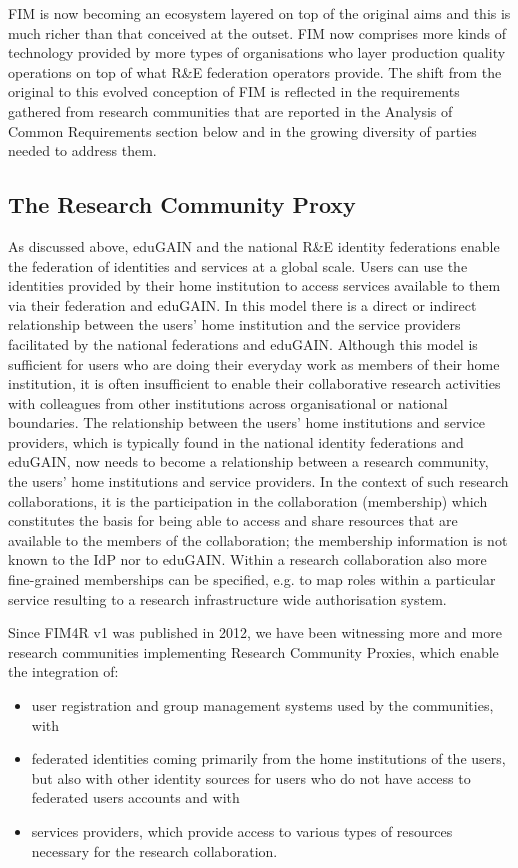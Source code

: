 \documentclass[fleqn,11pt]{wlscirep}
\begin{document}
{FIM is now becoming an ecosystem layered on top of the original aims and this is much richer than that conceived at the outset. FIM now comprises more kinds of technology provided by more types of organisations who layer production quality operations on top of what R\&E federation operators provide. The shift from the original to this evolved conception of FIM is reflected in the requirements gathered from research communities that are reported in the Analysis of Common Requirements section below and in the growing diversity of parties needed to address them.

\subsection{The Research Community Proxy}
As discussed above, eduGAIN and the national R\&E identity federations enable the federation of identities and services at a global scale. Users can use the identities provided by their home institution to access services available to them via their federation and eduGAIN. In this model there is a direct or indirect relationship between the users’ home institution and the service providers facilitated by the national federations and eduGAIN. Although this model is sufficient for users who are doing their everyday work as members of their home institution, it is often insufficient to enable their collaborative research activities with colleagues from other institutions across organisational or national boundaries. The relationship between the users' home institutions and service providers, which is typically found in the national identity federations and eduGAIN, now needs to become a relationship between a research community, the users' home institutions and service providers. In the context of such research collaborations, it is the participation in the collaboration (membership) which constitutes the basis for being able to access and share resources that are available to the members of the collaboration; the membership information is not known to the IdP nor to eduGAIN.  Within a research collaboration also more fine-grained memberships can be specified, e.g. to map roles within a particular service resulting to a research infrastructure wide authorisation system.

Since FIM4R v1 was published in 2012, we have been witnessing more and more research communities implementing Research Community Proxies, which enable the integration of:
\begin{itemize}
  \item user registration and group management systems used by the communities, with 
  \item federated identities coming primarily from the home institutions of the users, but also with other identity sources for users who do not have access to federated users accounts and with 
  \item services providers, which provide access to various types of resources necessary for the research collaboration. 
\end{itemize}

}
\end{document}
